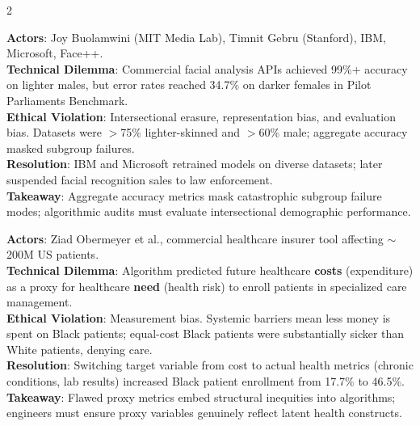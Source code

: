 \documentclass[9pt,a4paper]{extarticle}
\begin{document}
\begin{multicols}{2}
\begin{tcolorbox}[casebox,title={7. Gender Shades (2018)}]
\textbf{Actors}: Joy Buolamwini (MIT Media Lab), Timnit Gebru (Stanford), IBM, Microsoft, Face++.\\
\textbf{Technical Dilemma}: Commercial facial analysis APIs achieved 99\%+ accuracy on lighter males, but error rates reached 34.7\% on darker females in Pilot Parliaments Benchmark.\\
\textbf{Ethical Violation}: Intersectional erasure, representation bias, and evaluation bias. Datasets were $>$75\% lighter-skinned and $>$60\% male; aggregate accuracy masked subgroup failures.\\
\textbf{Resolution}: IBM and Microsoft retrained models on diverse datasets; later suspended facial recognition sales to law enforcement.\\
\textbf{Takeaway}: Aggregate accuracy metrics mask catastrophic subgroup failure modes; algorithmic audits must evaluate intersectional demographic performance.
\end{tcolorbox}

\begin{tcolorbox}[casebox,title={8. Obermeyer Healthcare Risk Tool (2019)}]
\textbf{Actors}: Ziad Obermeyer et al., commercial healthcare insurer tool affecting $\sim$200M US patients.\\
\textbf{Technical Dilemma}: Algorithm predicted future healthcare \textbf{costs} (expenditure) as a proxy for healthcare \textbf{need} (health risk) to enroll patients in specialized care management.\\
\textbf{Ethical Violation}: Measurement bias. Systemic barriers mean less money is spent on Black patients; equal-cost Black patients were substantially sicker than White patients, denying care.\\
\textbf{Resolution}: Switching target variable from cost to actual health metrics (chronic conditions, lab results) increased Black patient enrollment from 17.7\% to 46.5\%.\\
\textbf{Takeaway}: Flawed proxy metrics embed structural inequities into algorithms; engineers must ensure proxy variables genuinely reflect latent health constructs.
\end{tcolorbox}


\end{multicols}
\end{document}
